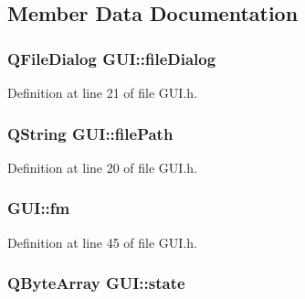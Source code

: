 \subsection{Member Data Documentation}
\hypertarget{a00002_a9ed0a8b583419e88bb94697a9b258c72}{
\subsubsection[{file\-Dialog}]{\setlength{\rightskip}{0pt plus 5cm}Q\-File\-Dialog G\-U\-I\-::file\-Dialog\hspace{0.3cm}{\ttfamily [private]}}}\label{d7/d46/a00002_a9ed0a8b583419e88bb94697a9b258c72}


Definition at line 21 of file G\-U\-I.\-h.

\hypertarget{a00002_a62d0a4c604ed8d65f85455971a938548}{
\subsubsection[{file\-Path}]{\setlength{\rightskip}{0pt plus 5cm}Q\-String G\-U\-I\-::file\-Path\hspace{0.3cm}{\ttfamily [private]}}}\label{d7/d46/a00002_a62d0a4c604ed8d65f85455971a938548}


Definition at line 20 of file G\-U\-I.\-h.

\hypertarget{a00002_a73cc90505024488d2fd77762ad5059c4}{
\subsubsection[{fm}]{ G\-U\-I\-::fm\hspace{0.3cm}{\ttfamily [private]}}}\label{d7/d46/a00002_a73cc90505024488d2fd77762ad5059c4}


Definition at line 45 of file G\-U\-I.\-h.

\hypertarget{a00002_aa3abed87f53b22188d76a134e427b30d}{
\subsubsection[{state}]{\setlength{\rightskip}{0pt plus 5cm}Q\-Byte\-Array G\-U\-I\-::state\hspace{0.3cm}{\ttfamily [private]}}}\label{d7/d46/a00002_aa3abed87f53b22188d76a134e427b30d}


